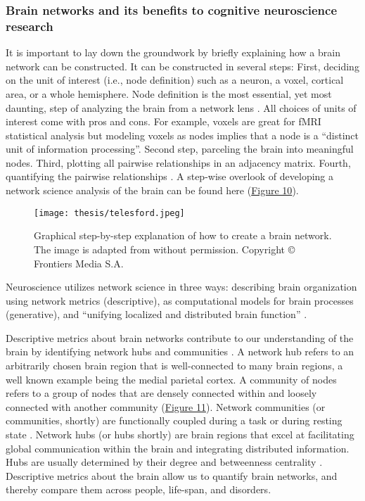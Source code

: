 \documentclass[11pt,a4paper]{article}
\begin{document}
        \subsubsection{Brain networks and its benefits to cognitive neuroscience research}
        It is important to lay down the groundwork by briefly explaining how a brain network can be constructed. It can be constructed in several steps: First, deciding on the unit of interest (i.e., node definition) such as a neuron, a voxel, cortical area, or a whole hemisphere. Node definition is the most essential, yet most daunting, step of analyzing the brain from a network lens \cite{bullmore_complex_2009, wig_concepts_2011}. All choices of units of interest come with pros and cons. For example, voxels are great for fMRI statistical analysis but modeling voxels as nodes implies that a node is a “distinct unit of information processing”.  Second step, parceling the brain into meaningful nodes. Third, plotting all pairwise relationships in an adjacency matrix. Fourth, quantifying the pairwise relationships \cite{wig_concepts_2011}. A step-wise overlook of developing a network science analysis of the brain can be found here \cite{telesford_brain_2011} (\hyperlink{fig:telesford}{Figure 10}).
        
        \begin{figure}[H]
            \hypertarget{fig:telesford}{}
            \centering
            \texttt{[image: thesis/telesford.jpeg]}\\
            \caption{Graphical step-by-step explanation of how to create a brain network. The image is adapted from \cite{telesford_exploration_2013} without permission. Copyright \copyright {} Frontiers Media S.A.} 
            \label{fig:enter-label}
        \end{figure}
        
        Neuroscience utilizes network science in three ways: describing brain organization using network metrics (descriptive), as computational models for brain processes (generative), and “unifying localized and distributed brain function” \cite{sporns_contributions_2014}.
        
        Descriptive metrics about brain networks contribute to our understanding of the brain by identifying network hubs and communities \cite{sporns_contributions_2014}. A network hub refers to an arbitrarily chosen brain region that is well-connected to many brain regions, a well known example being the medial parietal cortex. A community of nodes refers to a group of nodes that are densely connected within and loosely connected with another community (\hyperlink{fig:sporns-2013}{Figure 11}). Network communities (or communities, shortly) are functionally coupled during a task or during resting state \cite{sporns_network_2013}. Network hubs (or hubs shortly) are brain regions that excel at facilitating global communication within the brain and integrating distributed information. Hubs are usually determined by their degree and betweenness centrality \cite{sporns_network_2013}. Descriptive metrics about the brain allow us to quantify brain networks, and thereby compare them across people, life-span, and disorders.
        
\end{document}

